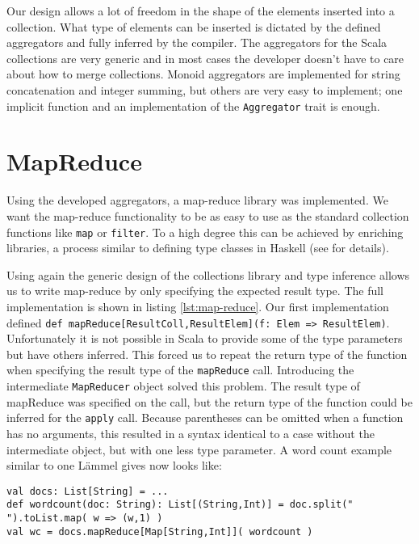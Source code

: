 \documentclass[10pt,a4paper]{article}
\begin{document}
Our design allows a lot of freedom in the shape of the elements inserted into a collection. What type of elements can be inserted is dictated by the defined aggregators and fully inferred by the compiler. The aggregators for the Scala collections are very generic and in most cases the developer doesn't have to care about how to merge collections. Monoid aggregators are implemented for string concatenation and integer summing, but others are very easy to implement; one implicit function and an implementation of the \lstinline|Aggregator| trait is enough.

\section{MapReduce}

Using the developed aggregators, a map-reduce library was implemented. We want the map-reduce functionality to be as easy to use as the standard collection functions like \lstinline|map| or \lstinline|filter|. To a high degree this can be achieved by enriching libraries, a process similar to defining type classes in Haskell (see \cite{odersky2006pimp} for details).

Using again the generic design of the collections library and type inference allows us to write map-reduce by only specifying the expected result type. The full implementation is shown in listing \ref{lst:map-reduce}. Our first implementation defined \lstinline|def mapReduce[ResultColl,ResultElem](f: Elem => ResultElem)|. Unfortunately it is not possible in Scala to provide some of the type parameters but have others inferred. This forced us to repeat the return type of the function when specifying the result type of the \lstinline|mapReduce| call. Introducing the intermediate \lstinline|MapReducer| object solved this problem. The result type of mapReduce was specified on the call, but the return type of the function could be inferred for the \lstinline|apply| call. Because parentheses can be omitted when a function has no arguments, this resulted in a syntax identical to a case without the intermediate object, but with one less type parameter. A word count example similar to one L\"ammel gives now looks like:
\begin{lstlisting}
val docs: List[String] = ...
def wordcount(doc: String): List[(String,Int)] = doc.split(" ").toList.map( w => (w,1) )
val wc = docs.mapReduce[Map[String,Int]]( wordcount )
\end{lstlisting}
\end{document}
